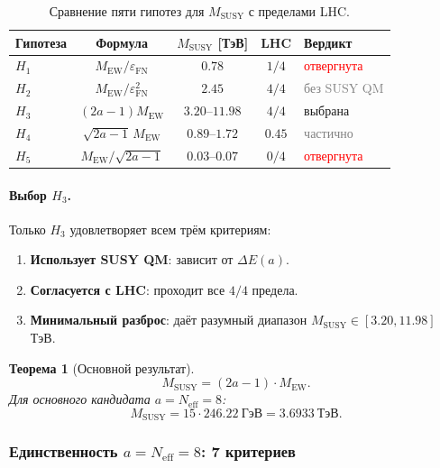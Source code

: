 \documentclass[11pt,a4paper]{article}
\newcommand{\MEW}{M_{\text{EW}}}
\newcommand{\MSUSY}{M_{\text{SUSY}}}
\newcommand{\epsFN}{\varepsilon_{\text{FN}}}
\newtheorem{theorem}{Теорема}[section]
\theoremstyle{definition}
\begin{document}
\begin{table}[htbp]
\centering
\caption{Сравнение пяти гипотез для $\MSUSY$ с пределами LHC.}
\label{tab:hypotheses-review}
\begin{tabular}{lcccl}
\toprule
Гипотеза & Формула & $\MSUSY$ [ТэВ] & LHC & Вердикт \\
\midrule
$H_1$ & $\MEW/\epsFN$ & $0.78$ & $1/4$ & \textcolor{red}{отвергнута} \\
$H_2$ & $\MEW/\epsFN^2$ & $2.45$ & $4/4$ 
      & \textcolor{gray}{без SUSY QM} \\
$H_3$ & $(2a - 1) \MEW$ & $3.20$--$11.98$ & $4/4$ 
      & \textcolor{green!60!black}{выбрана} \\
$H_4$ & $\sqrt{2a-1}\,\MEW$ & $0.89$--$1.72$ & $0.45$ 
      & \textcolor{gray}{частично} \\
$H_5$ & $\MEW/\sqrt{2a-1}$ & $0.03$--$0.07$ & $0/4$ 
      & \textcolor{red}{отвергнута} \\
\bottomrule
\end{tabular}
\end{table}

\paragraph{Выбор $H_3$.}
Только $H_3$ удовлетворяет всем трём критериям:
\begin{enumerate}
    \item \textbf{Использует SUSY QM}: зависит от $\Delta E(a)$.
    \item \textbf{Согласуется с LHC}: проходит все $4/4$ предела.
    \item \textbf{Минимальный разброс}: даёт разумный диапазон 
          $\MSUSY \in [3.20, 11.98]$ ТэВ.
\end{enumerate}

\begin{theorem}[Основной результат]
\label{thm:msusy-main-review}
\begin{equation}
    \boxed{
    \MSUSY = (2a - 1) \cdot \MEW.
    }
    \label{eq:msusy-h3-review}
\end{equation}
Для основного кандидата $a = N_{\text{eff}} = 8$:
\begin{equation}
    \boxed{
    \MSUSY = 15 \cdot 246.22~\text{ГэВ} = 3.6933~\text{ТэВ}.
    }
    \label{eq:msusy-final-review}
\end{equation}
\end{theorem}

\subsubsection{Единственность \texorpdfstring{$a = N_{\text{eff}} = 8$}{a = N\_eff = 8}: 7 критериев}
\end{document}
